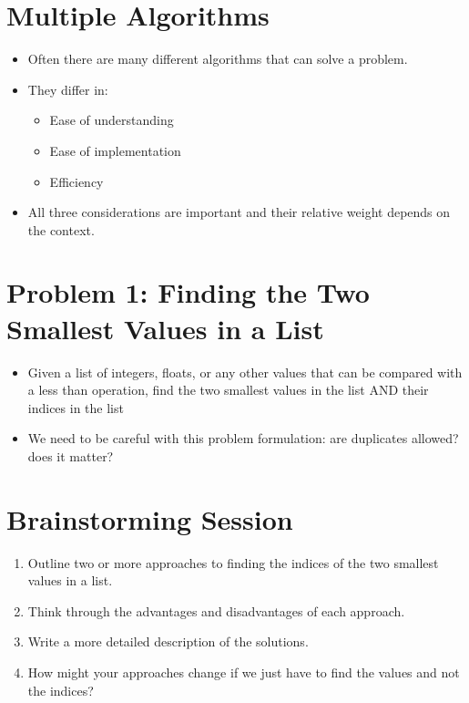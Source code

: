 \documentclass[letterpaper,10pt,english]{sphinxmanual}
\begin{document}
\section{Multiple Algorithms}
\label{\detokenize{lecture_notes/lec20_searching:multiple-algorithms}}\begin{itemize}
\item {} 
Often there are many different algorithms that can solve a problem.

\item {} 
They differ in:
\begin{itemize}
\item {} 
Ease of understanding

\item {} 
Ease of implementation

\item {} 
Efficiency

\end{itemize}

\item {} 
All three considerations are important and their relative weight
depends on the context.

\end{itemize}


\section{Problem 1: Finding the Two Smallest Values in a List}
\label{\detokenize{lecture_notes/lec20_searching:problem-1-finding-the-two-smallest-values-in-a-list}}\begin{itemize}
\item {} 
Given a list of integers, floats, or any other values that can be
compared with a less than operation, find the two smallest values in
the list AND their indices in the list

\item {} 
We need to be careful with this problem formulation: are duplicates
allowed? does it matter?

\end{itemize}


\section{Brainstorming Session}
\label{\detokenize{lecture_notes/lec20_searching:brainstorming-session}}\begin{enumerate}
\item {} 
Outline two or more approaches to finding the indices of the two
smallest values in a list.

\item {} 
Think through the advantages and disadvantages of each approach.

\item {} 
Write a more detailed description of the solutions.

\item {} 
How might your approaches change if we just have to find the values
and not the indices?

\end{enumerate}
\end{document}
